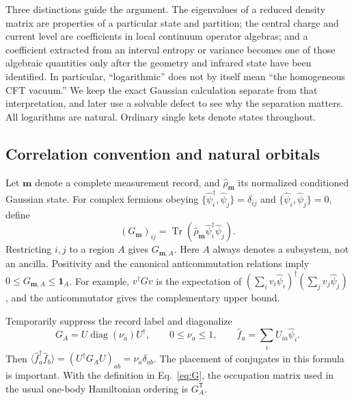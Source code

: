\documentclass[aps,prb,onecolumn,nofootinbib,superscriptaddress]{revtex4-2}
\newcommand{\Id}{\mathbf{1}}
\newcommand{\Tr}{\operatorname{Tr}}
\begin{document}
Three distinctions guide the argument. The eigenvalues of a reduced
density matrix are properties of a particular state and partition;
the central charge and current level are coefficients in local continuum
operator algebras; and a coefficient extracted from an interval entropy
or variance becomes one of those algebraic quantities only after the
geometry and infrared state have been identified. In particular,
``logarithmic'' does not by itself mean ``the homogeneous CFT vacuum.''
We keep the exact Gaussian calculation separate from that interpretation,
and later use a solvable defect to see why the separation matters.
All logarithms are natural. Ordinary single kets denote states throughout.

\subsection{Correlation convention and natural orbitals}
Let $\boldsymbol m$ denote a complete measurement record, and
$\hat\rho_{\boldsymbol m}$ its normalized conditioned Gaussian state. For
complex fermions obeying
$\{\hat\psi_i^\dagger,\hat\psi_j\}=\delta_{ij}$ and
$\{\hat\psi_i,\hat\psi_j\}=0$, define
\begin{equation}
 (G_{\boldsymbol m})_{ij}
 =\Tr(\hat\rho_{\boldsymbol m}\hat\psi_i^\dagger\hat\psi_j).
 \label{eq:G}
\end{equation}
Restricting $i,j$ to a region $A$ gives $G_{\boldsymbol m,A}$.
Here $A$ always denotes a subsystem, not an ancilla. Positivity and the
canonical anticommutation relations imply
$0\leq G_{\boldsymbol m,A}\leq\Id_A$. For example,
$v^\dagger Gv$ is the expectation of
$(\sum_i v_i\hat\psi_i)^\dagger(\sum_j v_j\hat\psi_j)$, and the
anticommutator gives the complementary upper bound.

Temporarily suppress the record label and diagonalize
\begin{equation}
 G_A=U\operatorname{diag}(\nu_a)U^\dagger,\qquad
 0\leq\nu_a\leq1,\qquad
 \hat f_a=\sum_i U_{ia}\hat\psi_i .
 \label{eq:natural-orbitals}
\end{equation}
Then
$\langle\hat f_a^\dagger\hat f_b\rangle
=(U^\dagger G_AU)_{ab}=\nu_a\delta_{ab}$.
The placement of conjugates in this formula is important. With the
definition in Eq.~\eqref{eq:G}, the occupation matrix used in the usual
one-body Hamiltonian ordering is $G_A^{\mathsf T}$.
\end{document}
